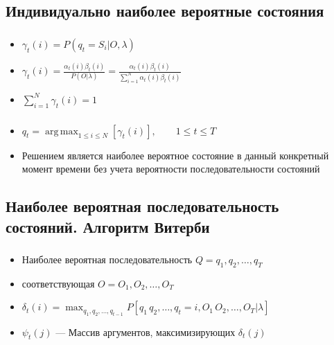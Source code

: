 \documentclass{beamer}
\DeclareMathOperator*{\argmax}{arg\,max}
\begin{document}
\subsection{Индивидуально наиболее вероятные состояния}

\begin{frame}
  \frametitle{\insertsection}
  \framesubtitle{\insertsubsection}

  \begin{itemize}
  \item $\displaystyle \gamma_t(i) = P(q_t = S_i | O, \lambda)$ \pause
  \item $\displaystyle \gamma_t(i) = \frac{\alpha_t(i) \beta_t(i)}{P(O | \lambda)} = \frac{\alpha_t(i) \beta_t(i)}{\sum_{i = 1}^{N} \alpha_t(i) \beta_t(i)}$
    \pause
  \item $\displaystyle \sum_{i = 1}^N \gamma_t(i) = 1$
  \end{itemize}

\end{frame}

\begin{frame}
  \frametitle{\insertsection}
  \framesubtitle{\insertsubsection}

  \begin{itemize}
  \item $\displaystyle q_t = \argmax_{1 \le i \le N}{[\gamma_t(i)]}, \qquad 1 \le t \le T$
    \item Решением является наиболее вероятное состояние в \alert{данный конкретный момент времени} без учета вероятности \alert{последовательности состояний}
  \end{itemize}

\end{frame}

\subsection{Наиболее вероятная последовательность состояний. Алгоритм Витерби}

\begin{frame}
  \frametitle{\insertsection}
  \framesubtitle{\insertsubsection}

  \begin{itemize}
  \item Наиболее вероятная последовательность $\displaystyle Q = q_1, q_2, \ldots, q_T$ \pause
  \item соответствующая $O = O_1, O_2, \ldots, O_T$ \pause
  \item $\displaystyle \delta_t(i) = \max_{q_1, q_2, \ldots, q_{t - 1}}{P[q_1\, q_2, \ldots, q_t = i, O_1\, O_2, \ldots, O_T|\lambda]}$
  \item $\psi_t(j)$ --- Массив аргументов, максимизирующих $\delta_t(j)$
  \end{itemize}

\end{frame}
\end{document}

